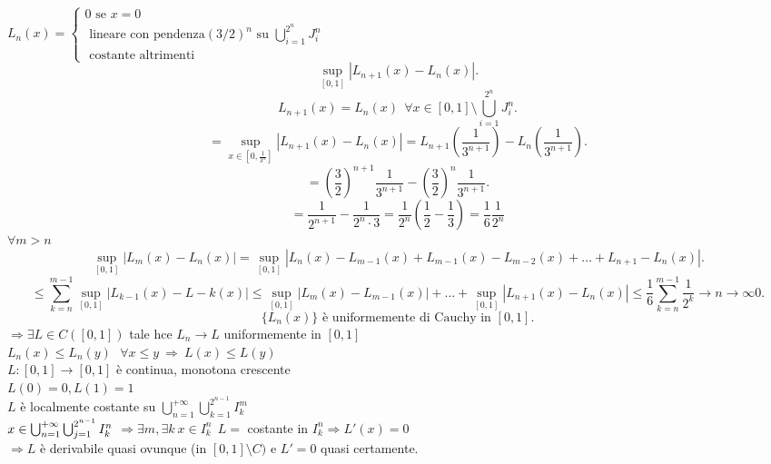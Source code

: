 \documentclass[12px]{article}
\begin{document}
	 $L_n(x) = \begin{cases}
		 0 \text{ se } x = 0\\
		 \text { lineare con pendenza} (3/2)^n \text{ su } \bigcup^{2^n}_{i=1}J_i^n\\
		 \text{ costante  \ \ \ \ altrimenti}
	 \end{cases}$
	 \[
		 \sup_{[0,1]}|L_{n+1}(x) - L_n(x)|
	 .\] 
	 \[
		 L_{n+1}(x) = L_n(x) \ \ \forall x\in[0,1]\setminus \bigcup^{2^n}_{i=1}J_i^n
	 .\] 
	 \[
		 = \sup_{x\in[0,\frac{1}{3^n}]}|L_{n+1}(x) - L_n(x)| = L_{n+1}(\frac{1}{3^{n+1}}) - L_n(\frac {1}{3^{n+1}})
	 .\] 
	 \[
		 = \left(\frac 32 \right)^{n+1}\frac 1 {3^{n+1}} - \left(\frac 32 \right)^n \frac 1 {3^{n+1}}
	 .\] 
 \[= \frac 1 {2^{n+1}} - \frac 1 {2^n\cdot 3} = \frac {1}{2^n} \left(\frac 12 - \frac 13 \right) = \frac 16 \frac 1 {2^n}\]
 $\forall m > n$\\
  \[
	  \sup_{[0,1]}|L_m(x)-L_n(x)| = \sup_{[0,1]} |L_n(x) - L_{m-1}(x) + L_{m-1}(x) - L_{m-2}(x) + \ldots + L_{n+1} - L_n(x)|
 .\] 
 \[
	 \leq \sum^{m-1}_{k = n}\sup_{[0,1]} | L_{k - 1}(x) - L-k(x)| \leq \sup_{[0,1]}|L_m(x) -L_{m-1}(x)|+\ldots + \sup_{[0,1]}|L_{n+1}(x) - L_n(x)| \leq \frac 16 \sum^{m-1}_{k=n}\frac {1}{2^k} \xrightarrow{}{n \rightarrow\infty} 0 
 .\] 
 \[
  \{L_n(x)\}\text { è uniformemente di Cauchy in }[0,1]
 .\] 
 $ \Rightarrow \exists L\in C([0,1])$ tale hce $L_n \rightarrow L$ uniformemente in $[0,1]$\\
  $L_n(x)\leq L_n(y)\ \ \ \forall x\leq y \ \Rightarrow  \ L(x) \leq L(y)$ \\
  $L : [0,1] \rightarrow [0,1]$ è continua, monotona crescente\\
  $L(0) = 0, L(1) = 1$\\
  $L$ è localmente costante su $ \bigcup^{+\infty}_{n = 1} \bigcup^{2^{n-1}}_{k = 1}I_k^m$\\
  $x\in \bigcup^{+\infty}_{n=1} \bigcup^{2^{n-1}}_{j = 1}I_k^n\\$
  $ \Rightarrow \exists m, \exists k \ x\in I_k^n \ \ L =  $ costante in $I_k^n \Rightarrow L'(x) = 0$ \\
  $ \Rightarrow L $ è derivabile quasi ovunque (in $[0,1]\setminus C)$ e  $L' = 0$ quasi certamente.\\
\end{document}
